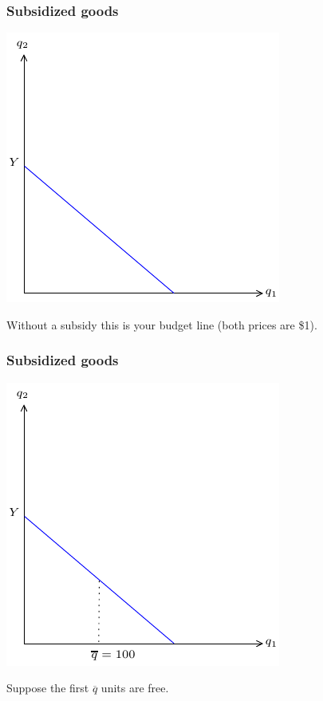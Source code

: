 \documentclass[xcolor=pdftex,dvipsnames]{beamer}
\begin{document}
\begin{frame}
\frametitle{Subsidized goods}
\begin{center}
\includegraphics{pics/Subsidy1}
\end{center}
Without a subsidy this is your budget line (both prices are \$1). 
\end{frame}


\begin{frame}
\frametitle{Subsidized goods}
\begin{center}
\includegraphics{pics/Subsidy2}
\end{center}
Suppose the first $\overline q$ units are free.
\end{frame}
\end{document}
